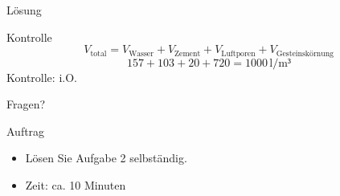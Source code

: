 \begin{frame}{Lösung}
    \begin{table}[h]
        \centering
        \caption{Aufgabe zur Stoffraumberechnung}
        \small
    \label{tab:Stoffraumberechnung}
        \end{table}

\end{frame}

\begin{frame}{Kontrolle}
    \begin{equation*}
    V_\text{total} = V_{\text{Wasser}} + V_{\text{Zement}} + V_{\text{Luftporen}} + V_{\text{Gesteinskörnung}}
    \end{equation*}
    \pause
    \vspace{1cm}
    \begin{equation*}
        157 + 103 + 20 + 720 = 1000 \, \text{l/m³}
    \end{equation*}
    \pause
    Kontrolle: i.O.


\end{frame}

\begin{frame}{Fragen?}

\end{frame}

\begin{frame}{Auftrag}
\begin{itemize}
    \item Lösen Sie Aufgabe 2 selbständig.
    \item Zeit: ca. 10 Minuten
\end{itemize}

\end{frame}







